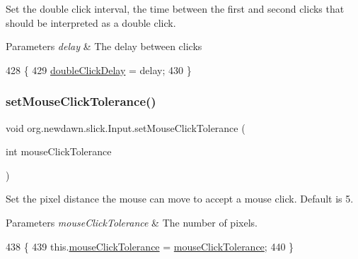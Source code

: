 Set the double click interval, the time between the first and second clicks that should be interpreted as a double click.


\begin{DoxyParams}{Parameters}
{\em delay} & The delay between clicks \\
\hline
\end{DoxyParams}

\begin{DoxyCode}
428                                                   \{
429         \mbox{\hyperlink{classorg_1_1newdawn_1_1slick_1_1_input_a42e5b78568d9726aae78751b4b9bac3f}{doubleClickDelay}} = delay;
430     \}
\end{DoxyCode}
\mbox{\label{classorg_1_1newdawn_1_1slick_1_1_input_a0fca68dcdaabaa2e7fe8213df68b913a}} 
\subsubsection{\texorpdfstring{set\+Mouse\+Click\+Tolerance()}{setMouseClickTolerance()}}
{\footnotesize\ttfamily void org.\+newdawn.\+slick.\+Input.\+set\+Mouse\+Click\+Tolerance (\begin{DoxyParamCaption}\item[{int}]{mouse\+Click\+Tolerance }\end{DoxyParamCaption})\hspace{0.3cm}{\ttfamily [inline]}}

Set the pixel distance the mouse can move to accept a mouse click. Default is 5.


\begin{DoxyParams}{Parameters}
{\em mouse\+Click\+Tolerance} & The number of pixels. \\
\hline
\end{DoxyParams}

\begin{DoxyCode}
438                                                                  \{
439         this.\mbox{\hyperlink{classorg_1_1newdawn_1_1slick_1_1_input_a8a57b217ce798c9495cefe02853ad65a}{mouseClickTolerance}} = \mbox{\hyperlink{classorg_1_1newdawn_1_1slick_1_1_input_a8a57b217ce798c9495cefe02853ad65a}{mouseClickTolerance}};
440     \}
\end{DoxyCode}
\mbox{\label{classorg_1_1newdawn_1_1slick_1_1_input_af618e44ab698b596f7b56e6bda4457eb}} 
